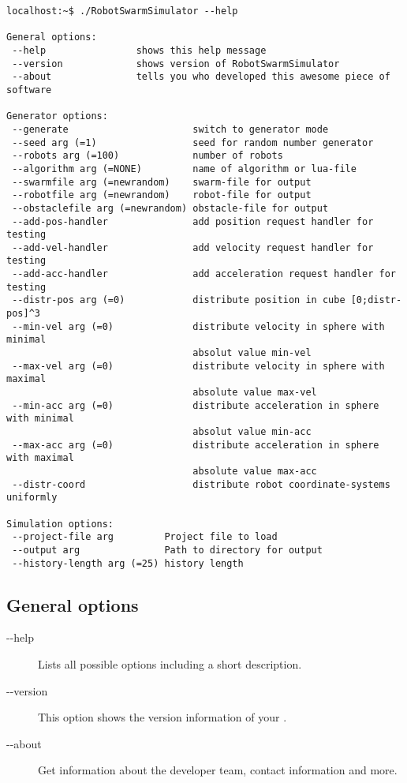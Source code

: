\documentclass[a4paper,halfparskip,11pt,twoside]{scrartcl}
\begin{document}
\begin{lstlisting}[caption={\RSS Helpline},label=lst:RSS-help]
localhost:~$ ./RobotSwarmSimulator --help

General options:
 --help                shows this help message
 --version             shows version of RobotSwarmSimulator
 --about               tells you who developed this awesome piece of software

Generator options:
 --generate                      switch to generator mode
 --seed arg (=1)                 seed for random number generator
 --robots arg (=100)             number of robots
 --algorithm arg (=NONE)         name of algorithm or lua-file
 --swarmfile arg (=newrandom)    swarm-file for output
 --robotfile arg (=newrandom)    robot-file for output
 --obstaclefile arg (=newrandom) obstacle-file for output
 --add-pos-handler               add position request handler for testing
 --add-vel-handler               add velocity request handler for testing
 --add-acc-handler               add acceleration request handler for testing
 --distr-pos arg (=0)            distribute position in cube [0;distr-pos]^3
 --min-vel arg (=0)              distribute velocity in sphere with minimal  
                                 absolut value min-vel
 --max-vel arg (=0)              distribute velocity in sphere with maximal
                                 absolute value max-vel
 --min-acc arg (=0)              distribute acceleration in sphere with minimal  
                                 absolut value min-acc
 --max-acc arg (=0)              distribute acceleration in sphere with maximal
                                 absolute value max-acc
 --distr-coord                   distribute robot coordinate-systems uniformly

Simulation options:
 --project-file arg         Project file to load
 --output arg               Path to directory for output
 --history-length arg (=25) history length
\end{lstlisting}


\subsection{General options}
\begin{description}
	\item [-{}-help] Lists all possible options including a short description.
	\item [-{}-version] This option shows the version information of your \RSS.
	\item [-{}-about] Get information about the developer team, contact information and more.
\end{description}
\end{document}
